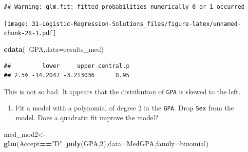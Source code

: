 \documentclass[
]{book}
\newenvironment{Shaded}{\begin{snugshade}}{\end{snugshade}}
\newcommand{\DataTypeTok}[1]{\textcolor[rgb]{0.13,0.29,0.53}{#1}}
\newcommand{\DecValTok}[1]{\textcolor[rgb]{0.00,0.00,0.81}{#1}}
\newcommand{\KeywordTok}[1]{\textcolor[rgb]{0.13,0.29,0.53}{\textbf{#1}}}
\newcommand{\NormalTok}[1]{#1}
\newcommand{\OperatorTok}[1]{\textcolor[rgb]{0.81,0.36,0.00}{\textbf{#1}}}
\newcommand{\StringTok}[1]{\textcolor[rgb]{0.31,0.60,0.02}{#1}}
\providecommand{\tightlist}{%
  \setlength{\itemsep}{0pt}\setlength{\parskip}{0pt}}
\begin{document}
\begin{verbatim}
## Warning: glm.fit: fitted probabilities numerically 0 or 1 occurred
\end{verbatim}

\begin{Shaded}
\end{Shaded}

\texttt{[image: 31-Logistic-Regression-Solutions\_files/figure-latex/unnamed-chunk-28-1.pdf]}

\begin{Shaded}
\begin{Highlighting}[]
\KeywordTok{cdata}\NormalTok{(}\OperatorTok{~}\NormalTok{GPA,}\DataTypeTok{data=}\NormalTok{results_med)}
\end{Highlighting}
\end{Shaded}

\begin{verbatim}
##         lower     upper central.p
## 2.5% -14.2047 -3.213036      0.95
\end{verbatim}

This is not so bad. It appears that the distribution of \texttt{GPA} is skewed to the left.

\begin{enumerate}
\def\labelenumi{\alph{enumi}.}
\setcounter{enumi}{2}
\tightlist
\item
  Fit a model with a polynomial of degree 2 in the \texttt{GPA}. Drop \texttt{Sex} from the model. Does a quadratic fit improve the model?
\end{enumerate}

\begin{Shaded}
\begin{Highlighting}[]
\NormalTok{med_mod2<-}\KeywordTok{glm}\NormalTok{(Accept}\OperatorTok{==}\StringTok{"D"}\OperatorTok{~}\KeywordTok{poly}\NormalTok{(GPA,}\DecValTok{2}\NormalTok{),}\DataTypeTok{data=}\NormalTok{MedGPA,}\DataTypeTok{family=}\NormalTok{binomial)}
\end{Highlighting}
\end{Shaded}
\end{document}
